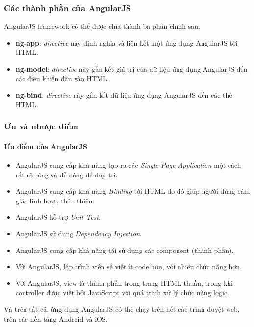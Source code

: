 \documentclass[a4paper]{article}
\begin{document}
\subsubsection{Các thành phần của AngularJS}
AngularJS framework có thể được chia thành ba phần chính sau:
\begin{itemize}
	\item \textbf{ng-app}: \textit{directive} này định nghĩa và liên kết một ứng dụng AngularJS tới HTML.

	\item \textbf{ng-model}: \textit{directive} này gắn kết giá trị của dữ liệu ứng dụng AngularJS đến các điều khiển đầu vào HTML.

	\item \textbf{ng-bind}: \textit{directive} này gắn kết dữ liệu ứng dụng AngularJS đến các thẻ HTML.
\end{itemize}
\subsubsection{Ưu và nhược điểm}
\paragraph*{Ưu điểm của AngularJS}
\begin{itemize}
	\item AngularJS cung cấp khả năng tạo ra các \textit{Single Page Application} một cách rất rõ ràng và dễ dàng để duy trì.

	\item AngularJS cung cấp khả năng \textit{Binding} tới HTML do đó giúp người dùng cảm giác linh hoạt, thân thiện.

	\item AngularJS hỗ trợ \textit{Unit Test}.

	\item AngularJS sử dụng \textit{Dependency Injection}.

	\item AngularJS cung cấp khả năng tái sử dụng các component (thành phần).

	\item Với AngularJS, lập trình viên sẽ viết ít code hơn, với nhiều chức năng hơn.

	\item Với AngularJS, view là thành phần trong trang HTML thuần, trong khi controller được viết bởi JavaScript với quá trình xử lý chức năng logic.
\end{itemize}
Và trên tất cả, ứng dụng AngularJS có thể chạy trên hết các trình duyệt web, trên các nền tảng Android và iOS.
\end{document}
